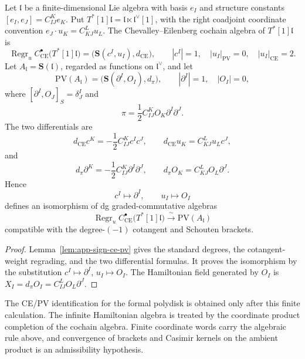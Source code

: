 \documentclass[11pt]{memoir}
\begin{document}
\begin{lem}\label{lem:finite-cotangent-ce-pv-calculation}
  Let \(\mathfrak l\) be a finite-dimensional Lie algebra with basis
  \(e_I\) and structure constants \([e_I,e_J]=C^K_{IJ}e_K\).  Put
  \(T^*[1]\mathfrak l=\mathfrak l\ltimes\mathfrak l^\vee[1]\), with the
  right coadjoint coordinate convention
  \(e_J\cdot u_K=C^L_{KJ}u_L\).  The Chevalley--Eilenberg cochain algebra
  of \(T^*[1]\mathfrak l\) is
  \[
    \operatorname{Regr}_u C^\bullet_{\mathrm{CE}}\bigl(T^*[1]\mathfrak l\bigr)
    =\bigl(\mathbf S(c^I,u_I),d_{\mathrm{CE}}\bigr),
    \qquad |c^I|=1,\quad |u_I|_{\mathrm{PV}}=0,
    \quad |u_I|_{\mathrm{CE}}=2 .
  \]
  Let \(A_{\mathfrak l}=\mathbf S(\mathfrak l)\), regarded as functions
  on \(\mathfrak l^\vee\), and let
  \[
    \mathrm{PV}(A_{\mathfrak l})
      =\bigl(\mathbf S(\partial^I,O_I),d_\pi\bigr),
    \qquad |\partial^I|=1,\quad |O_I|=0,
  \]
  where \([\partial^I,O_J]_S=\delta^I_J\) and
  \[
    \pi=\frac12 C^K_{IJ}O_K\partial^I\partial^J .
  \]
  The two differentials are
  \[
    d_{\mathrm{CE}}c^K=-\frac12 C^K_{IJ}c^Ic^J,\qquad
    d_{\mathrm{CE}}u_K=C^L_{KJ}u_Lc^J,
  \]
  and
  \[
    d_\pi\partial^K=-\frac12 C^K_{IJ}\partial^I\partial^J,\qquad
    d_\pi O_K=C^L_{KJ}O_L\partial^J .
  \]
  Hence
  \[
    c^I\longmapsto\partial^I,\qquad u_I\longmapsto O_I
  \]
  defines an isomorphism of dg graded-commutative algebras
  \[
    \operatorname{Regr}_u C^\bullet_{\mathrm{CE}}\bigl(T^*[1]\mathfrak l\bigr)
      \xrightarrow{\ \sim\ }
    \mathrm{PV}(A_{\mathfrak l})
  \]
  compatible with the degree-\((-1)\) cotangent and Schouten brackets.
\end{lem}

\begin{proof}
  Lemma~\ref{lem:app-sign-ce-pv} gives the standard degrees, the
  cotangent-weight regrading, and the two differential formulas.  It
  proves the isomorphism by the substitution
  \(c^I\mapsto\partial^I\), \(u_I\mapsto O_I\).  The Hamiltonian field
  generated by \(O_I\) is
  \(X_I=d_\pi O_I=C^L_{IJ}O_L\partial^J\).
\end{proof}

The CE/PV identification for the formal polydisk is obtained only after
this finite calculation.  The infinite Hamiltonian algebra is treated by
the coordinate product completion of the cochain algebra.  Finite
coordinate words carry the algebraic rule above, and convergence of
brackets and Casimir kernels on the ambient product is an admissibility
hypothesis.
\end{document}
